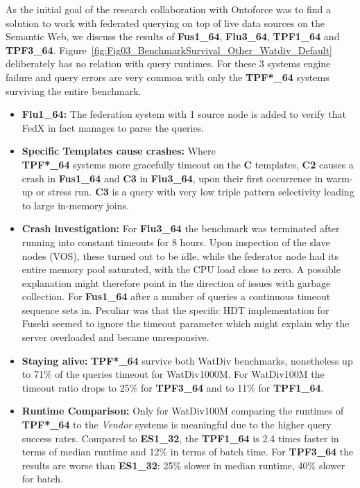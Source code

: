 As the initial goal of the research collaboration with Ontoforce was to find a solution to work with federated querying on top of live data sources on the Semantic Web, we discuss the results of \textbf{Fus1\_64}, \textbf{Flu3\_64}, \textbf{TPF1\_64} and \textbf{TPF3\_64}. 
Figure~\ref{fig:Fig03_BenchmarkSurvival_Other_Watdiv_Default} deliberately has no relation with query runtimes. For these 3 systems engine failure and query errors are very common with only the \textbf{TPF*\_64} systems surviving the entire benchmark. 
\begin{itemize}
	\item \textbf{Flu1\_64:} The federation system with 1 source node is added to verify that FedX in fact manages to parse the queries.
	\item \textbf{Specific Templates cause crashes:} Where \\ \textbf{TPF*\_64} systems more gracefully timeout on the \textbf{C} templates, \textbf{C2} causes a crash in \textbf{Fus1\_64} and \textbf{C3} in \textbf{Flu3\_64}, upon their first occurrence in warm-up or stress run. \textbf{C3} is a query with very low triple pattern selectivity leading to large in-memory joins.
	\item \textbf{Crash investigation:} For \textbf{Flu3\_64} the benchmark was terminated after running into constant timeouts for 8 hours. Upon inspection of the slave nodes (VOS), these turned out to be idle, while the federator node had its entire memory pool saturated, with the CPU load close to zero. A possible explanation might therefore point in the direction of issues with garbage collection.
	For \textbf{Fus1\_64} after a number of queries a continuous timeout sequence sets in. Peculiar was that the specific HDT implementation for Fuseki seemed to ignore the timeout parameter which might explain why the server overloaded and became unresponsive.
	\item \textbf{Staying alive:} \textbf{TPF*\_64} survive both WatDiv benchmarks, nonetheless up to 71\% of the queries timeout for WatDiv1000M. For WatDiv100M the timeout ratio drops to 25\% for \textbf{TPF3\_64} and to 11\% for \textbf{TPF1\_64}.
%
	\item \textbf{Runtime Comparison: } Only for WatDiv100M comparing the runtimes of \textbf{TPF*\_64} to the \emph{Vendor} systems is meaningful due to the higher query success rates. Compared to \textbf{ES1\_32}, the \textbf{TPF1\_64} is 2.4 times faster in terms of median runtime and 12\% in terms of batch time. For \textbf{TPF3\_64} the results are worse than \textbf{ES1\_32}: 25\% slower in median runtime, 40\% slower for batch.
\end{itemize}
